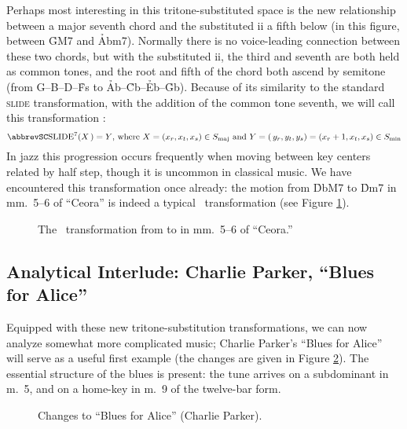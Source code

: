{Perhaps most interesting in this tritone-substituted space is the new
relationship between a major seventh chord and the substituted ii a
fifth below (in this figure, between \h{GM7} and \h{Abm7}). Normally there is
no voice-leading connection between these two chords, but with the substituted
ii, the third and seventh are both held as common tones, and the root
and fifth of the chord both ascend by semitone (from G--B--D--\h{Fs} to
\h{Ab}--\h{Cb}--\h{Eb}--\h{Gb}). Because of its similarity to the
standard \textsc{slide} transformation, with the addition of the common tone
seventh, we will call this transformation \slideS:
%
{\novspace%
\begin{displaymath}
    \text{\slideS}(X\,) = Y\text{, where}\ X = (x_r, x_t, x_s) \in \Smaj
     \text{ and}\
    Y = (\,y_r, y_t, y_s) = (x_r + 1, x_t, x_s) \in \Smin
\end{displaymath}}%
%
In jazz this progression occurs frequently when moving between key
centers related by half step, though it is uncommon in classical
music.\fn{tft-4} We have encountered this transformation once already: the
motion from \h{DbM7} to \h{Dm7} in mm.~5--6 of ``Ceora'' is indeed a typical
\slideS\ transformation (see Figure \ref{tft:slide7-ceora}).

\begin{figure}[htbp]
  \caption{The \slideS\ transformation from \protect{} to
    \protect\caph{Dm7} in mm.~5--6 of ``Ceora.''}
  \label{tft:slide7-ceora}
\end{figure}




\subsection{Analytical Interlude: Charlie Parker, ``Blues for Alice''}
\label{sec:blues-for-alice}

Equipped with these new tritone-substitution transformations, we can now
analyze somewhat more complicated music; Charlie Parker’s “Blues for Alice”
will serve as a useful first example (the changes are given in Figure
\ref{tft:blues-alice-changes}).\fn{tft-5} The essential structure of the blues is
present: the tune arrives on a subdominant in m.~5, and on a home-key \tf in
m.~9 of the twelve-bar form.

\begin{figure}[tbp]
  \caption{Changes to ``Blues for Alice'' (Charlie Parker).}
  \label{tft:blues-alice-changes}
\end{figure}

}
